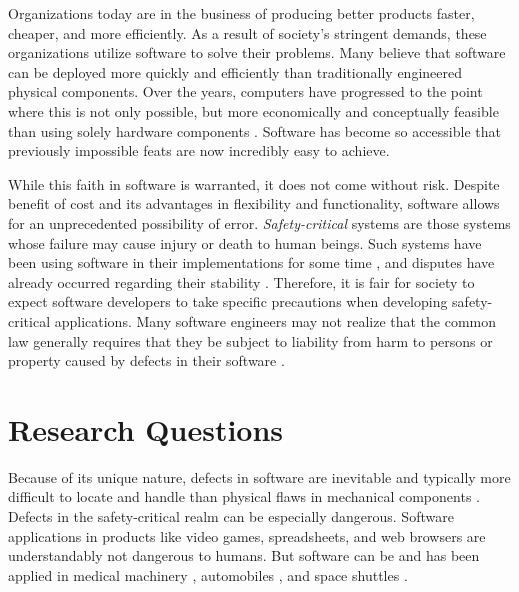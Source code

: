 \documentclass[12pt]{report}
\begin{document}
Organizations today are in the business of producing better products faster, cheaper, and more efficiently. As a result of society's stringent demands, these organizations utilize software to solve their problems. Many believe that software can be deployed more quickly and efficiently than traditionally engineered physical components. Over the years, computers have progressed to the point where this is not only possible, but more economically and conceptually feasible than using solely hardware components \cite{FAKE}. Software has become so accessible that previously impossible feats are now incredibly easy to achieve. 

While this faith in software is warranted, it does not come without risk. Despite benefit of cost and its advantages in flexibility and functionality, software allows for an unprecedented possibility of error. \textit{Safety-critical} systems are those systems whose failure may cause injury or death to human beings. Such systems have been using software in their implementations for some time \cite{FAKE}, and disputes have already occurred regarding their stability \cite{FAKE}. Therefore, it is fair for society to expect software developers to take specific precautions when developing safety-critical applications. Many software engineers may not realize that the common law generally requires that they be subject to liability from harm to persons or property caused by defects in their software \cite{FAKE}. 

\section{Research Questions} 

Because of its unique nature, defects in software are inevitable and typically more difficult to locate and handle than physical flaws in mechanical components \cite{FAKE}. Defects in the safety-critical realm can be especially dangerous. Software applications in products like video games, spreadsheets, and web browsers are understandably not dangerous to humans. But software can be and has been applied in medical machinery \cite{FAKE}, automobiles \cite{FAKE}, and space shuttles \cite{FAKE}.
\end{document}
